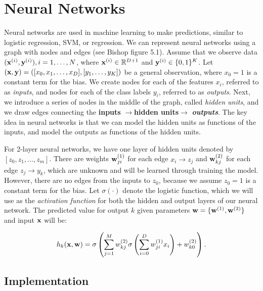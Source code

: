 
\section{Neural Networks}\label{sec:neural_networks}

Neural networks are used in machine learning to make predictions, similar to logistic regression, SVM, or regression.  We can represent neural networks using a graph with nodes and edges (see Bishop figure 5.1).  Assume that we observe data $(\boldsymbol{\mathbf{x}}^{(i)},\boldsymbol{\mathbf{y}}^{(i)}), i = 1, \ldots, N$,  where $\boldsymbol{\mathbf{x}}^{(i)} \in \mathbb{R}^{D+1}$ and $\boldsymbol{\mathbf{y}}^{(i)} \in \{0,1\}^K$.  Let $(\boldsymbol{\mathbf{x}},\boldsymbol{\mathbf{y}}) = ([x_0, x_1, \ldots, x_D],[y_1, \ldots, y_K])$ be a general observation, where $x_0 = 1$ is a constant term for the bias.  We create nodes for each of the features $x_i$, referred to as \emph{inputs}, and nodes for each of the class labels $y_i$, referred to as \emph{outputs}.  Next, we introduce a series of nodes in the middle of the graph, called \emph{hidden units}, and we draw edges connecting the {\bf inputs} $\rightarrow ${\bf hidden units}$ \rightarrow$ \emph{\bf outputs}.  The key idea in neural networks is that we can model the hidden units as functions of the inputs, and model the outputs as functions of the hidden units.   

For 2-layer neural networks, we have one layer of hidden units denoted by $[z_0, z_1,\ldots, z_m]$.   There are weights $\boldsymbol{\mathbf{w}}^{(1)}_{ji}$ for each edge $x_i \rightarrow z_j$ and $\boldsymbol{\mathbf{w}}^{(2)}_{kj}$ for each edge $z_j \rightarrow y_k$, which are unknown and will be learned through training the model.  However, there are no edges from the inputs to $z_0$, because we assume $z_0 = 1$ is a constant term for the bias.  Let $\sigma(\cdot)$ denote the logistic function, which we will use as the \emph{activation function} for both the hidden and output layers of our neural network.  The predicted value for output $k$ given parameters $\boldsymbol{\mathbf{w}} = \{\boldsymbol{\mathbf{w}}^{(1)}, \boldsymbol{\mathbf{w}}^{(2)}\}$ and input $\boldsymbol{\mathbf{x}}$ will be:

\begin{equation}
h_{k}(\boldsymbol{\mathbf{x}},\boldsymbol{\mathbf{w}}) = \sigma\left(\sum_{j=1}^{M} w^{(2)}_{kj} \sigma\left(\sum_{i=0}^{D} w^{(1)}_{ji} x_i\right)  + w_{k0}^{(2)} \right).
\end{equation}

\subsection{Implementation}

